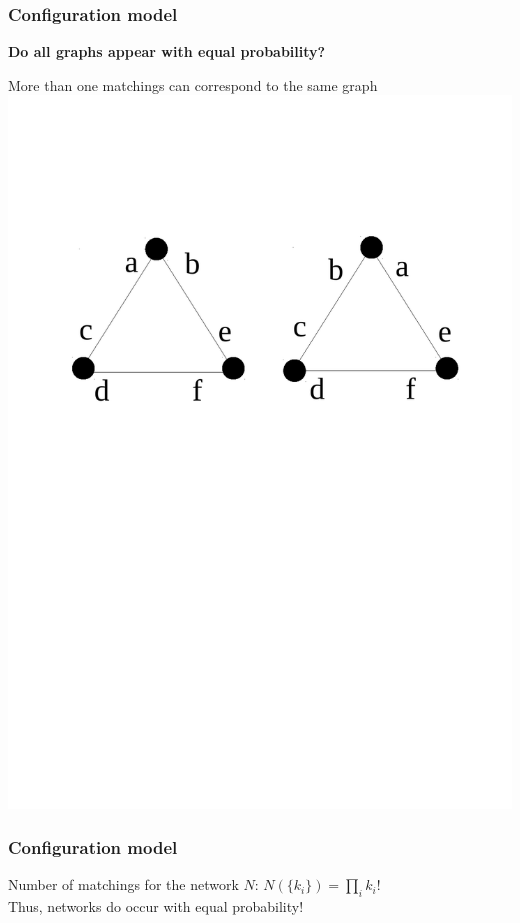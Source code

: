 \documentclass{beamer}
\begin{document}
\begin{frame}
    \frametitle{Configuration model}
    \centering
    \vspace{2em}
    {\bf Do all graphs appear with equal probability?}

    \pause
    \vspace{1em}
    More than one matchings can correspond to the same graph
    \includegraphics[width=0.8\columnwidth,trim = 0 200 0 80, clip = true]{triangle.pdf} 
\end{frame}
\begin{frame}
    \frametitle{Configuration model}
    \centering
    Number of matchings for the network $N$: $N(\{k_i\}) = \prod_ik_i!$\\

    \vspace{2em}
    Thus, networks do occur with equal probability!
\end{frame}
\end{document}
